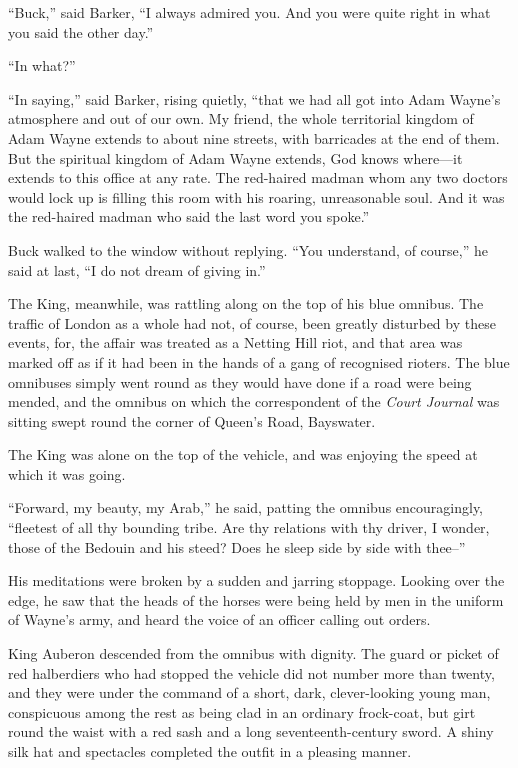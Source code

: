 \documentclass{book}
\begin{document}
“Buck,” said Barker, “I always admired you. And you were quite right in what you said the other day.”

“In what?”

“In saying,” said Barker, rising quietly, “that we had all got into Adam Wayne’s atmosphere and out of our own. My friend, the whole territorial kingdom of Adam Wayne extends to about nine streets, with barricades at the end of them. But the spiritual kingdom of Adam Wayne extends, God knows where—it extends to this office at any rate. The red-haired madman whom any two doctors would lock up is filling this room with his roaring, unreasonable soul. And it was the red-haired madman who said the last word you spoke.”

Buck walked to the window without replying. “You understand, of course,” he said at last, “I do not dream of giving in.”

The King, meanwhile, was rattling along on the top of his blue omnibus. The traffic of London as a whole had not, of course, been greatly disturbed by these events, for, the affair was treated as a Netting Hill riot, and that area was marked off as if it had been in the hands of a gang of recognised rioters. The blue omnibuses simply went round as they would have done if a road were being mended, and the omnibus on which the correspondent of the \emph{Court Journal} was sitting swept round the corner of Queen’s Road, Bayswater.

The King was alone on the top of the vehicle, and was enjoying the speed at which it was going.

“Forward, my beauty, my Arab,” he said, patting the omnibus encouragingly, “fleetest of all thy bounding tribe. Are thy relations with thy driver, I wonder, those of the Bedouin and his steed? Does he sleep side by side with thee–”

His meditations were broken by a sudden and jarring stoppage. Looking over the edge, he saw that the heads of the horses were being held by men in the uniform of Wayne’s army, and heard the voice of an officer calling out orders.

King Auberon descended from the omnibus with dignity. The guard or picket of red halberdiers who had stopped the vehicle did not number more than twenty, and they were under the command of a short, dark, clever-looking young man, conspicuous among the rest as being clad in an ordinary frock-coat, but girt round the waist with a red sash and a long seventeenth-century sword. A shiny silk hat and spectacles completed the outfit in a pleasing manner.
\end{document}
